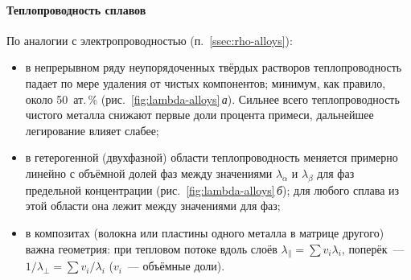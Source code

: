 \paragraph{Теплопроводность сплавов}
По аналогии с электропроводностью (п.~\ref{ssec:rho-alloys}):
\begin{itemize}
\item в непрерывном ряду неупорядоченных твёрдых растворов теплопроводность
падает по мере удаления от чистых компонентов; минимум, как правило, около
50~ат.\,\% (рис.~\ref{fig:lambda-alloys}\,\textit{а}). Сильнее всего
теплопроводность чистого металла снижают первые доли процента примеси,
дальнейшее легирование влияет слабее;
\item в гетерогенной (двухфазной) области теплопроводность меняется
примерно линейно с объёмной долей фаз между значениями
$\lambda_\alpha$ и $\lambda_\beta$ для фаз предельной концентрации
(рис.~\ref{fig:lambda-alloys}\,\textit{б}); для любого сплава из этой
области она лежит между значениями для фаз;
\item в композитах (волокна или пластины одного металла в матрице другого)
важна геометрия: при тепловом потоке вдоль слоёв
$\lambda_\parallel=\sum v_i\lambda_i$, поперёк~— $1/\lambda_\perp=\sum v_i/\lambda_i$
($v_i$~— объёмные доли).
\end{itemize}

